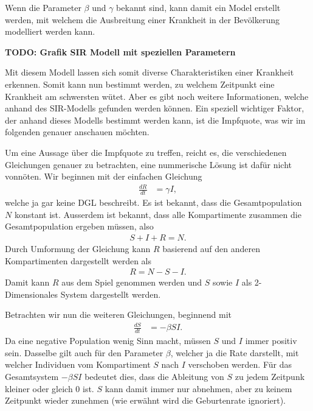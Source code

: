 \begin{refsection}
Wenn die Parameter $\beta$ und $\gamma$ bekannt sind, kann damit ein Model erstellt werden, mit welchem die Ausbreitung einer Krankheit in der Bevölkerung modelliert werden kann.

\textbf{TODO: Grafik SIR Modell mit speziellen Parametern}

Mit diesem Modell lassen sich somit diverse Charakteristiken einer Krankheit erkennen. 
Somit kann nun bestimmt werden, zu welchem Zeitpunkt eine Krankheit am schwersten wütet. 
Aber es gibt noch weitere Informationen, welche anhand des SIR-Modells gefunden werden können.
Ein speziell wichtiger Faktor, der anhand dieses Modells bestimmt werden kann, ist die Impfquote, was wir im folgenden genauer anschauen möchten.

Um eine Aussage über die Impfquote zu treffen, reicht es, die verschiedenen Gleichungen genauer zu betrachten, eine nummerische Lösung ist dafür nicht vonnöten.
Wir beginnen mit der einfachen Gleichung
\begin{align*}
  \frac{dR}{dt} &= \gamma I,
\end{align*}
welche ja gar keine DGL beschreibt. 
Es ist bekannt, dass die Gesamtpopulation $N$ konstant ist. 
Ausserdem ist bekannt, dass alle Kompartimente zusammen die Gesamtpopulation ergeben müssen, also
\begin{align*}
  S + I + R = N.
\end{align*}
Durch Umformung der Gleichung kann $R$ basierend auf den anderen Kompartimenten dargestellt werden als
\begin{align*}
  R = N - S - I.
\end{align*}
Damit kann $R$ aus dem Spiel genommen werden und $S$ sowie $I$ als 2-Dimensionales System dargestellt werden.

Betrachten wir nun die weiteren Gleichungen, beginnend mit 
\begin{align*}
  \frac{dS}{dt} & = -\beta S I.
\end{align*}
Da eine negative Population wenig Sinn macht, müssen $S$ und $I$ immer positiv sein. 
Dasselbe gilt auch für den Parameter $\beta$, welcher ja die Rate darstellt, mit welcher Individuen vom Kompartiment $S$ nach $I$ verschoben werden.
Für das Gesamtsystem $-\beta S I$ bedeutet dies, dass die Ableitung von $S$ zu jedem Zeitpunk kleiner oder gleich 0 ist. $S$ kann damit immer nur abnehmen, aber zu keinem Zeitpunkt wieder zunehmen (wie erwähnt wird die Geburtenrate ignoriert).


\end{refsection}
